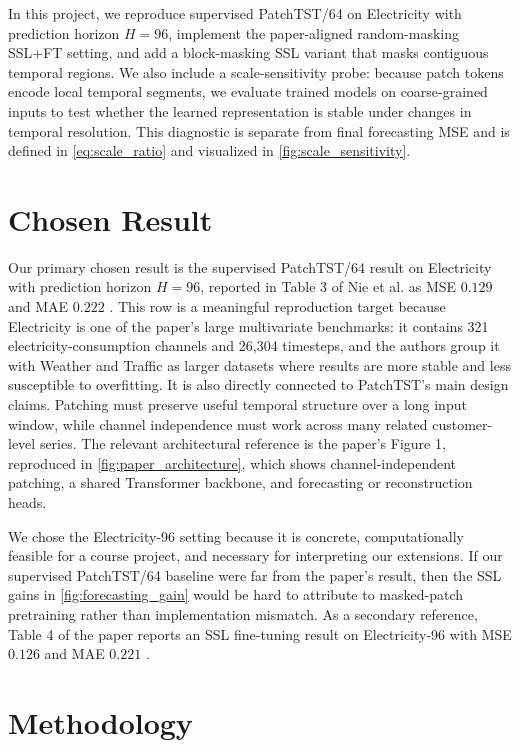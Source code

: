 \documentclass[11pt,twocolumn]{article}
\begin{document}
In this project, we reproduce supervised PatchTST/64 on Electricity with prediction horizon $H=96$, implement the paper-aligned random-masking SSL+FT setting, and add a block-masking SSL variant that masks contiguous temporal regions. We also include a scale-sensitivity probe: because patch tokens encode local temporal segments, we evaluate trained models on coarse-grained inputs to test whether the learned representation is stable under changes in temporal resolution. This diagnostic is separate from final forecasting MSE and is defined in \eqref{eq:scale_ratio} and visualized in \autoref{fig:scale_sensitivity}.



\section{Chosen Result}

Our primary chosen result is the supervised PatchTST/64 result on Electricity with prediction horizon $H=96$, reported in Table 3 of Nie et al. as MSE $0.129$ and MAE $0.222$ \cite{nie2023patchtst}. This row is a meaningful reproduction target because Electricity is one of the paper's large multivariate benchmarks: it contains 321 electricity-consumption channels and 26,304 timesteps, and the authors group it with Weather and Traffic as larger datasets where results are more stable and less susceptible to overfitting. It is also directly connected to PatchTST's main design claims. Patching must preserve useful temporal structure over a long input window, while channel independence must work across many related customer-level series. The relevant architectural reference is the paper's Figure 1, reproduced in \autoref{fig:paper_architecture}, which shows channel-independent patching, a shared Transformer backbone, and forecasting or reconstruction heads.

We chose the Electricity-96 setting because it is concrete, computationally feasible for a course project, and necessary for interpreting our extensions. If our supervised PatchTST/64 baseline were far from the paper's result, then the SSL gains in \autoref{fig:forecasting_gain} would be hard to attribute to masked-patch pretraining rather than implementation mismatch. As a secondary reference, Table 4 of the paper reports an SSL fine-tuning result on Electricity-96 with MSE $0.126$ and MAE $0.221$ \cite{nie2023patchtst}. 





\section{Methodology}
\end{document}

